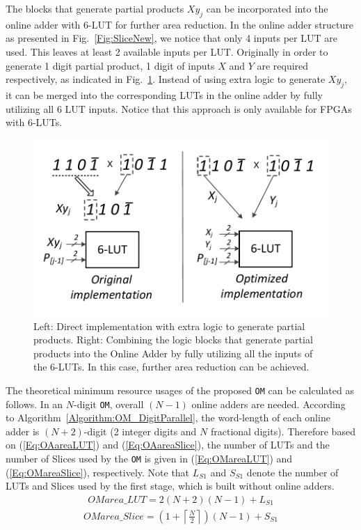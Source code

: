\documentclass[conference]{IEEEtran}
\begin{document}
The blocks that generate partial products $Xy_j$ can be incorporated into the online adder with 6-LUT for further area reduction. In the online adder structure as presented in Fig.~\ref{Fig:SliceNew}, we notice that only 4 inputs per LUT are used. This leaves at least 2 available inputs per LUT. Originally in order to generate 1 digit partial product, 1 digit of inputs $X$ and $Y$ are required respectively, as indicated in Fig.~\ref{Fig:PartialProduct}. Instead of using extra logic to generate $Xy_j$, it can be merged into the corresponding LUTs in the online adder by fully utilizing all 6 LUT inputs. Notice that this approach is only available for FPGAs with 6-LUTs.
%
\begin{figure}[tbp]
	\centering
	\includegraphics[width=.4\textwidth]{./Figures/PartialProduct.pdf}
	\vspace{-1ex}
	\caption{Left: Direct implementation with extra logic to generate partial products. Right: Combining the logic blocks that generate partial products into the Online Adder by fully utilizing all the inputs of the 6-LUTs. In this case, further area reduction can be achieved.}
	\label{Fig:PartialProduct}
	\vspace{-1ex}
\end{figure}

The theoretical minimum resource usages of the proposed \texttt{OM} can be calculated as follows. In an $N$-digit \texttt{OM}, overall $(N-1)$ online adders are needed. According to Algorithm~\ref{Algorithm:OM_DigitParallel}, the word-length of each online adder is $(N+2)$-digit (2 integer digits and $N$ fractional digits). Therefore based on (\ref{Eq:OAareaLUT}) and (\ref{Eq:OAareaSlice}), the number of LUTs and the number of Slices used by the \texttt{OM} is given in (\ref{Eq:OMareaLUT}) and (\ref{Eq:OMareaSlice}), respectively. Note that $L_{S1}$ and $S_{S1}$ denote the number of LUTs and Slices used by the first stage, which is built without online adders.
%
\begin{eqnarray}\label{Eq:OMareaLUT}
	OMarea\_{LUT} = 2(N+2)(N-1) + {L}_{S1}
\end{eqnarray}
%
\begin{eqnarray}\label{Eq:OMareaSlice}
	OMarea\_{Slice} = (1+\left\lceil{\frac{N}{2}}\right\rceil)(N-1)+S_{S1}
\end{eqnarray}
\end{document}
